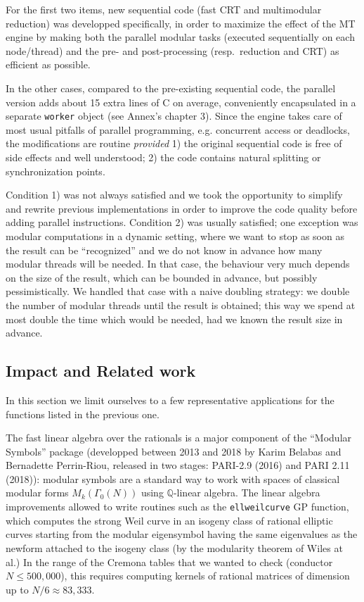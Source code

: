 \documentclass{deliverablereport}
\begin{document}
For the first two items, new sequential code (fast CRT and multimodular
reduction) was developped specifically, in order to maximize the effect of
the MT engine by making both the parallel modular tasks (executed
sequentially on each node/thread) and the pre- and post-processing
(resp.~reduction and CRT) as efficient as possible.

In the other cases, compared to the pre-existing sequential code, the
parallel version adds about 15 extra lines of C on average, conveniently
encapsulated in a separate \texttt{worker} object (see Annex's chapter 3).
Since the engine takes care of most usual pitfalls of parallel programming,
e.g. concurrent access or deadlocks, the modifications are routine
\emph{provided} 1) the original sequential code is free of side effects and
well understood; 2) the code contains natural splitting or synchronization
points.

Condition 1) was not always satisfied and we took the opportunity to simplify
and rewrite previous implementations in order to improve the code quality
before adding parallel instructions. Condition 2) was usually satisfied; one
exception was modular computations in a dynamic setting, where we want to
stop as soon as the result can be ``recognized'' and we do not know in
advance how many modular threads will be needed. In that case, the behaviour
very much depends on the size of the result, which can be bounded in advance,
but possibly pessimistically. We handled that case with a naive doubling
strategy: we double the number of modular threads until the result is
obtained; this way we spend at most double the time which would be needed,
had we known the result size in advance.

\subsection{Impact and Related work}

In this section we limit ourselves to a few representative applications
for the functions listed in the previous one.

The fast linear algebra over the rationals is a major component
of the ``Modular Symbols'' package (developped between 2013 and 2018
by Karim Belabas and Bernadette Perrin-Riou, released in two stages: PARI-2.9
(2016) and PARI 2.11 (2018)): modular symbols are a standard way to work with
spaces of classical modular forms $M_k(\Gamma_0(N))$ using
$\mathbb{Q}$-linear algebra. The linear algebra improvements allowed to write
routines such as the \texttt{ellweilcurve} GP function, which computes the
strong Weil curve in an isogeny class of rational elliptic curves starting
from the modular eigensymbol having the same eigenvalues as the newform
attached to the isogeny class (by the modularity theorem of Wiles at al.) In
the range of the Cremona tables that we wanted to check (conductor $N \leq
500,000$), this requires computing kernels of rational matrices of dimension
up to $N / 6\approx 83,333$.
\end{document}
